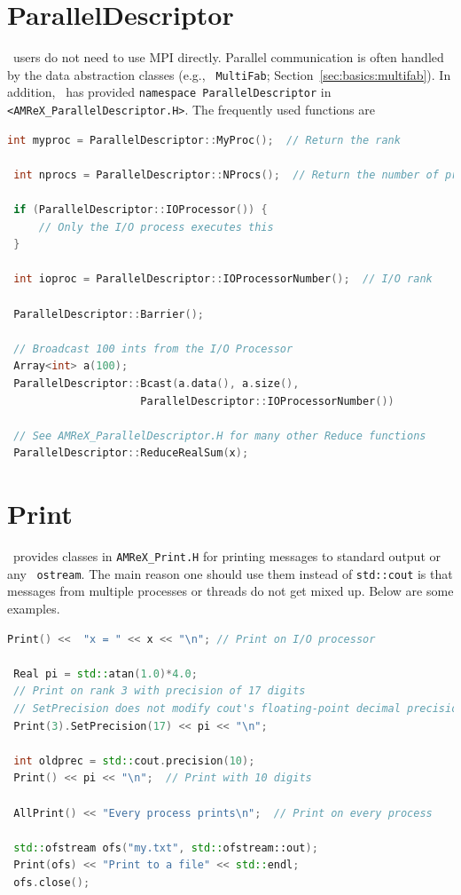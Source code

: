 \section{ParallelDescriptor}

\amrex\ users do not need to use MPI directly.  Parallel communication
is often handled by the data abstraction classes (e.g., {\tt
  MultiFab}; Section~\ref{sec:basics:multifab}).  In addition, \amrex\
has provided {\tt namespace ParallelDescriptor} in {\tt
  <AMReX\_ParallelDescriptor.H>}.  The frequently used functions are
\begin{lstlisting}[language=cpp]
 int myproc = ParallelDescriptor::MyProc();  // Return the rank
 
 int nprocs = ParallelDescriptor::NProcs();  // Return the number of processes
 
 if (ParallelDescriptor::IOProcessor()) { 
     // Only the I/O process executes this
 }
 
 int ioproc = ParallelDescriptor::IOProcessorNumber();  // I/O rank
 
 ParallelDescriptor::Barrier();
 
 // Broadcast 100 ints from the I/O Processor
 Array<int> a(100);
 ParallelDescriptor::Bcast(a.data(), a.size(),
                     ParallelDescriptor::IOProcessorNumber())
 
 // See AMReX_ParallelDescriptor.H for many other Reduce functions 
 ParallelDescriptor::ReduceRealSum(x);
\end{lstlisting}

\section{Print}
\label{sec:basics:print}

\amrex\ provides classes in {\tt AMReX\_Print.H} for printing messages
to standard output or any \cpp\ {\tt ostream}.  The main reason one
should use them instead of {\tt std::cout} is that messages from
multiple processes or threads do not get mixed up.  Below are some
examples.
\begin{lstlisting}[language=cpp]
 Print() <<  "x = " << x << "\n"; // Print on I/O processor
 
 Real pi = std::atan(1.0)*4.0;
 // Print on rank 3 with precision of 17 digits
 // SetPrecision does not modify cout's floating-point decimal precision setting.
 Print(3).SetPrecision(17) << pi << "\n";

 int oldprec = std::cout.precision(10);
 Print() << pi << "\n";  // Print with 10 digits
 
 AllPrint() << "Every process prints\n";  // Print on every process
 
 std::ofstream ofs("my.txt", std::ofstream::out);
 Print(ofs) << "Print to a file" << std::endl;
 ofs.close();
\end{lstlisting}

